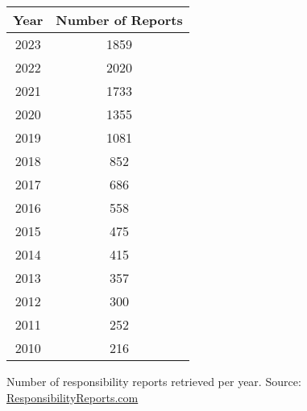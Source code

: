\documentclass[12pt]{article}
\begin{document}
\begin{table}

    \label{tab:sust_reps}
    \centering

    \begin{tabular}{cc}
        \toprule
        Year & Number of Reports\\
        \midrule
        2023 & 1859\\
        2022 & 2020\\
        2021 & 1733\\
        2020 & 1355\\
        2019 & 1081\\
        2018 & 852\\
        2017 & 686\\
        2016 & 558\\
        2015 & 475\\
        2014 & 415\\
        2013 & 357\\
        2012 & 300\\
        2011 & 252\\
        2010 & 216\\
        \bottomrule
    \end{tabular}

    \vspace{0.2cm}

    \begin{tablenotes}
        \footnotesize
        \item Number of responsibility reports retrieved per year. Source: \href{https://responsibilityreports.com}{ResponsibilityReports.com}
    \end{tablenotes}

\end{table}

\end{document}
